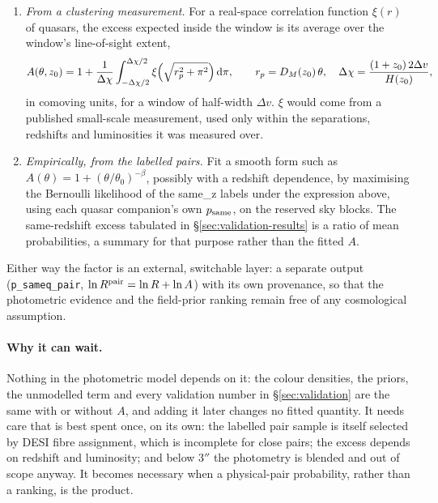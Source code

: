 \documentclass[11pt,a4paper]{article}
\newcommand{\dd}{\mathrm{d}}
\begin{document}
\begin{enumerate}
\item \emph{From a clustering measurement.} For a real-space correlation
function $\xi(r)$ of quasars, the excess expected inside the window is its
average over the window's line-of-sight extent,
%
\begin{equation}
A(\theta,z_0) = 1 + \frac{1}{\Delta\chi}\int_{-\Delta\chi/2}^{\Delta\chi/2}
\xi\Bigl(\sqrt{r_p^2+\pi^2}\Bigr)\,\dd\pi,
\qquad r_p = D_M(z_0)\,\theta,\quad
\Delta\chi = \frac{(1+z_0)\,2\Delta v}{H(z_0)},
\end{equation}
%
in comoving units, for a window of half-width $\Delta v$. $\xi$ would come from
a published small-scale measurement, used only within the separations,
redshifts and luminosities it was measured over.
\item \emph{Empirically, from the labelled pairs.} Fit a smooth form such as
$A(\theta)=1+(\theta/\theta_0)^{-\beta}$, possibly with a redshift dependence, by
maximising the Bernoulli likelihood of the \textsf{same\_z} labels under the
expression above, using each quasar companion's own $p_{\rm same}$, on the
reserved sky blocks. The same-redshift excess tabulated in
\S\ref{sec:validation-results} is a ratio of mean probabilities, a summary for
that purpose rather than the fitted $A$.
\end{enumerate}

Either way the factor is an external, switchable layer: a separate output
(\texttt{p\_sameq\_pair}, $\ln R^{\rm pair}=\ln R+\ln A$) with its own provenance,
so that the photometric evidence and the field-prior ranking remain free of any
cosmological assumption.

\paragraph{Why it can wait.} Nothing in the photometric model depends on it:
the colour densities, the priors, the unmodelled term and every validation
number in \S\ref{sec:validation} are the same with or without $A$, and adding it
later changes no fitted quantity. It needs care that is best spent once, on its
own: the labelled pair sample is itself selected by DESI fibre assignment,
which is incomplete for close pairs; the excess depends on redshift and
luminosity; and below $3''$ the photometry is blended and out of scope anyway.
It becomes necessary when a physical-pair probability, rather than a ranking, is
the product.

\appendix
\end{document}
